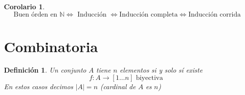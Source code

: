 \documentclass{article}
\theoremstyle{break}
\newtheorem{corollary}{Corolario}[theorem]
\newtheorem{definition}{Definición}[section]
\def \N{\mathbb{N}}
\begin{document}
    \begin{corollary}
        $$ \text {Buen órden en } \N \iff \text{ Inducción } \iff \text{Inducción completa} \iff \text{Inducción corrida}$$
    \end{corollary}
    
    \section{Combinatoria}

    \begin{definition}
        Un conjunto $A$ tiene $n$ elementos si y solo sí existe $$f: A \rightarrow [1\ldots n] \text{ biyectiva }$$
        En estos casos decimos $|A| = n$ (cardinal de $A$ es $n$)
    \end{definition}
    
\end{document}
